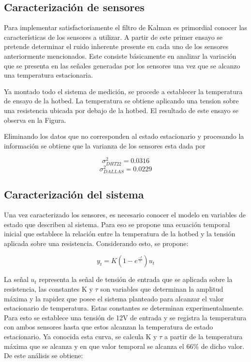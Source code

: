 \documentclass[journal]{IEEEtran}
\begin{document}
 \subsection{Caracterización de sensores}
 Para implementar satisfactoriamente el filtro de Kalman es primordial conocer las características de los sensores a utilizar. A partir de este primer ensayo se pretende determinar el ruido inherente presente en cada uno de los sensores  anteriormente mencionados. Este consiste básicamente en analizar la variación que se presenta en las señales generadas por los sensores una vez que se alcanzo una temperatura estacionaria.
 
 Ya montado todo el sistema de medición, se procede a establecer la temperatura de ensayo de la hotbed. La temperatura se obtiene aplicando una tension sobre una resistencia ubicada por debajo de la hotbed. El resultado de este ensayo se observa en la Figura.
 
 Eliminando los datos que no corresponden al estado estacionario y procesando la información se obtiene que la varianza de los sensores esta dada por
 
 \[\sigma^2_{DHT22}=0.0316\]
 \[\sigma^2_{DALLAS}=0.0229\]
 
\subsection{Caracterización del sistema}
Una vez caracterizado los sensores, es necesario conocer el modelo en variables de estado que describen al sistema. Para eso se propone una ecuación temporal inicial que establece  la relación entre la temperatura de la hotbed y la tensión aplicada sobre una resistencia. Considerando esto, se propone: 

\begin{equation}
y_{t}=K(1-e^{\frac{-t}{\tau}})u_{t}
\label{eq:6}
\end{equation}
  

  
 La señal $u_t$ representa la señal de tensión de entrada que se aplicada sobre la resistencia, las constantes K y $\tau$ son variables que determinan la amplitud máxima y la rapidez que posee el sistema planteado para alcanzar el valor estacionario de temperatura. Estas constantes se determinan experimentalmente. Para esto se establece una tensión de 12V de entrada y se registra la temperatura con ambos sensores hasta que estos alcanzan la temperatura de estado estacionario. 
  Ya conocida esta curva, se calcula K y $\tau$ a partir de la temperatura máxima que se alcanza y en que valor temporal se alcanza el 66\% de dicho valor. De este análisis se obtiene:
  
\end{document}
